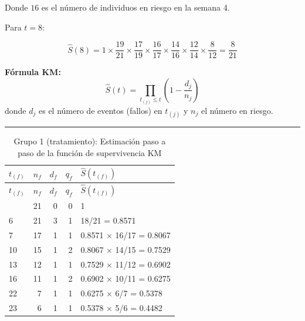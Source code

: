 \documentclass[
]{article}
\begin{document}
\begin{tcolorbox}
Donde \(16\) es el número de individuos en riesgo en la semana 4.

Para \(t = 8\):

\[
\hat{S}(8) = 1 \times \frac{19}{21} \times \frac{17}{19} \times \frac{16}{17} \times \frac{14}{16} \times \frac{12}{14} \times \frac{8}{12} = \frac{8}{21}
\]

\end{tcolorbox}

\textbf{Fórmula KM:}\\
\[
\hat{S}(t) = \prod_{t_{(j)} \le t} \left( 1 - \frac{d_j}{n_j} \right)
\] donde \(d_j\) es el número de eventos (fallos) en \(t_{(j)}\) y
\(n_j\) el número en riesgo.

\begin{center}\rule{0.5\linewidth}{0.5pt}\end{center}

\begin{longtable}[]{@{}lrrrl@{}}
\caption{Grupo 1 (tratamiento): Estimación paso a paso de la función de
supervivencia KM}\tabularnewline
\toprule\noalign{}
\(t_{(f)}\) & \(n_f\) & \(d_f\) & \(q_f\) & \(\hat{S}(t_{(f)})\) \\
\midrule\noalign{}
\endfirsthead
\toprule\noalign{}
\(t_{(f)}\) & \(n_f\) & \(d_f\) & \(q_f\) & \(\hat{S}(t_{(f)})\) \\
\midrule\noalign{}
\endhead
\bottomrule\noalign{}
\endlastfoot
0 & 21 & 0 & 0 & 1 \\
6 & 21 & 3 & 1 & 18/21 = 0.8571 \\
7 & 17 & 1 & 1 & 0.8571 × 16/17 = 0.8067 \\
10 & 15 & 1 & 2 & 0.8067 × 14/15 = 0.7529 \\
13 & 12 & 1 & 1 & 0.7529 × 11/12 = 0.6902 \\
16 & 11 & 1 & 2 & 0.6902 × 10/11 = 0.6275 \\
22 & 7 & 1 & 1 & 0.6275 × 6/7 = 0.5378 \\
23 & 6 & 1 & 1 & 0.5378 × 5/6 = 0.4482 \\
\end{longtable}
\end{document}
